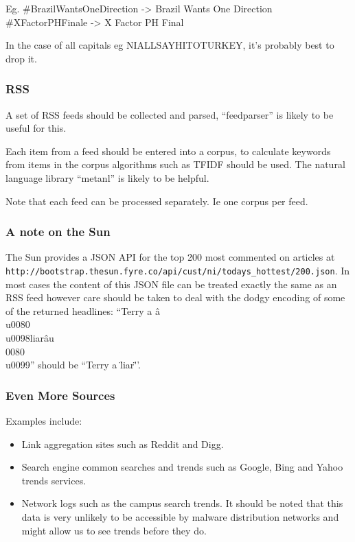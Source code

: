 Eg. \#BrazilWantsOneDirection -> Brazil Wants One Direction
\#XFactorPHFinale -> X Factor PH Final

In the case of all capitals eg NIALLSAYHITOTURKEY, it's probably best to drop it.

\subsubsection{RSS}
A set of RSS feeds should be collected and parsed, ``feedparser'' is likely to be useful for this.

Each item from a feed should be entered into a corpus, to calculate keywords from items in the corpus algorithms such as TFIDF should be used. The natural language library ``metanl'' is likely to be helpful.

Note that each feed can be processed separately. Ie one corpus per feed.

\subsubsection{A note on the Sun}
The Sun provides a JSON API for the top 200 most commented on articles at \verb`http://bootstrap.thesun.fyre.co/api/cust/ni/todays_hottest/200.json`. In most cases the content of this JSON file can be treated exactly the same as an RSS feed however care should be taken to deal with the dodgy encoding of some of the returned headlines: ``Terry a â\\u0080\\u0098liarâu\\0080\\u0099'' should be ``Terry a \"liar\"''.

\subsubsection{Even More Sources}
Examples include:
\begin{itemize}
    \item Link aggregation sites such as Reddit and Digg.
    \item Search engine common searches and trends such as Google, Bing and Yahoo trends services.
    \item Network logs such as the campus search trends. It should be noted that this data is very unlikely to be accessible by malware distribution networks and might allow us to see trends before they do.
\end{itemize}

